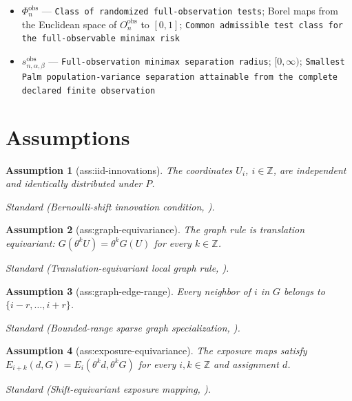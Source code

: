 \documentclass{article}
\newtheorem{assumption}{Assumption}
\begin{document}
\begin{itemize}
  \item \(\Phi_n^{\mathrm{obs}}\) --- \texttt{Class of randomized full-\allowbreak{}observation tests}; Borel maps from the Euclidean space of \(O_n^{\mathrm{obs}}\) to \([0,1]\); \texttt{Common admissible test class for the full-\allowbreak{}observable minimax risk}
  \item \(s_{n,\alpha,\beta}^{\mathrm{obs}}\) --- \texttt{Full-\allowbreak{}observation minimax separation radius}; \([0,\infty)\); \texttt{Smallest Palm population-\allowbreak{}variance separation attainable from the complete declared finite observation}
\end{itemize}

\section{Assumptions}

\begin{assumption}[ass:iid-innovations]\label{ass:iid-innovations}
The coordinates \(U_i\), \(i\in\mathbb Z\), are independent and identically distributed under \(P\).
\par\smallskip\noindent\emph{Standard} (Bernoulli-shift innovation condition, \cite{ElMachkouriVolnyWu2013}).
\end{assumption}

\begin{assumption}[ass:graph-equivariance]\label{ass:graph-equivariance}
The graph rule is translation equivariant: \(G(\theta^kU)=\theta^kG(U)\) for every \(k\in\mathbb Z\).
\par\smallskip\noindent\emph{Standard} (Translation-equivariant local graph rule, \cite{BaryshnikovYukich2005}).
\end{assumption}

\begin{assumption}[ass:graph-edge-range]\label{ass:graph-edge-range}
Every neighbor of \(i\) in \(G\) belongs to \(\{i-r,\ldots,i+r\}\).
\par\smallskip\noindent\emph{Standard} (Bounded-range sparse graph specialization, \cite{BaryshnikovYukich2005}).
\end{assumption}

\begin{assumption}[ass:exposure-equivariance]\label{ass:exposure-equivariance}
The exposure maps satisfy \(E_{i+k}(d,G)=E_i(\theta^kd,\theta^kG)\) for every \(i,k\in\mathbb Z\) and assignment \(d\).
\par\smallskip\noindent\emph{Standard} (Shift-equivariant exposure mapping, \cite{AronowSamii2017}).
\end{assumption}
\end{document}
